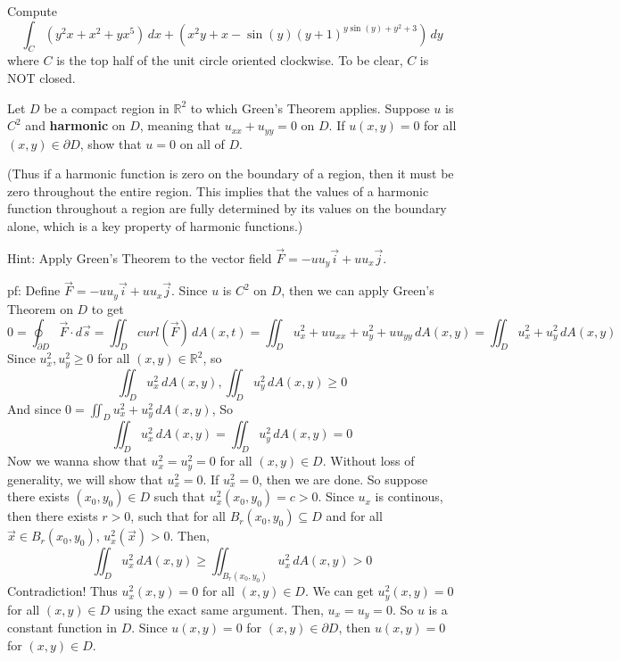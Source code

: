 \documentclass[11pt,letterpaper,cm]{nupset}
\begin{document}
\begin{problem}[Exercise 1] Compute
	$$\int_C (y^2x+x^2+yx^5)\,dx+(x^2y+x-\sin(y)(y+1)^{y\sin(y)+y^2+3})\,dy$$
	where $C$ is the top half of the unit circle oriented clockwise. To be clear, $C$ is NOT closed.
\end{problem}
\begin{solution}
\end{solution}
\newpage

\begin{problem}[Exercise 2] Let $D$ be a compact region in $\mathbb{R}^2$ to which Green's Theorem applies. Suppose $u$ is $C^2$ and \textbf{harmonic} on $D$, meaning that $u_{xx}+u_{yy} = 0$ on $D$.  If $u(x,y) = 0$ for all $(x,y) \in \partial D$, show that $u = 0$ on all of $D$.
	\medskip
	
	(Thus if a harmonic function is zero on the boundary of a region, then it must be zero throughout the entire region. This implies that the values of a harmonic function throughout a region are fully determined by its values on the boundary alone, which is a key property of harmonic functions.)
	\medskip
	
	Hint: Apply Green's Theorem to the vector field $\vec{F} = -uu_y\vec{i}+uu_x\vec{j}$.
\end{problem}
\begin{solution}
	pf: Define $\vec{F}=-uu_y\vec{i}+uu_x\vec{j}$. Since $u$ is $C^2$ on $D$, then we can apply Green's Theorem on $D$ to get
	$$0=\oint_{\partial D} \vec{F}\cdot d\vec{s}=\iint_{D}curl (\vec{F})\,dA(x,t)=\iint_D u_x^2+uu_{xx}+u_y^2+uu_{yy}\,dA(x,y)=\iint_D u_x^2+u_y^2\,dA(x,y)$$
	Since $u_x^2,u_y^2\geq 0$ for all $(x,y)\in \mathbb{R}^2$, so 
	$$\iint_D u_x^2\,dA(x,y),\iint_D u_y^2\,dA(x,y)\geq 0$$
	And since $0=\iint_D u_x^2+u_y^2\,dA(x,y)$, So
	$$\iint_D u_x^2\,dA(x,y)=\iint_D u_y^2\,dA(x,y)=0$$
	Now we wanna show that $u_x^2=u_y^2=0$ for all $(x,y)\in D$. Without loss of generality, we will show that $u_x^2=0$. If $u_x^2=0$, then we are done. So suppose there exists $(x_0,y_0)\in D$ such that $u_x^2(x_0,y_0)=c>0$. Since $u_x$ is continous, then there exists $r>0$, such that for all $B_r(x_0,y_0)\subseteq D$ and for all $\vec{x}\in B_r(x_0,y_0)$, $u_x^2(\vec{x})>0$. Then,
	$$\iint_D u_x^2\,dA(x,y)\geq \iint_{B_r(x_0,y_0)}u_x^2\,dA(x,y)>0$$
	Contradiction! Thus $u_x^2(x,y)=0$ for all $(x,y)\in D$. We can get $u_y^2(x,y)=0$ for all $(x,y)\in D$ using the exact same argument.
	Then, $u_x=u_y=0$. So $u$ is a constant function in $D$. Since $u(x,y)=0$ for $(x,y)\in \partial D$, then $u(x,y)=0$ for $(x,y)\in D$. 
\end{solution}
\newpage
\end{document}
